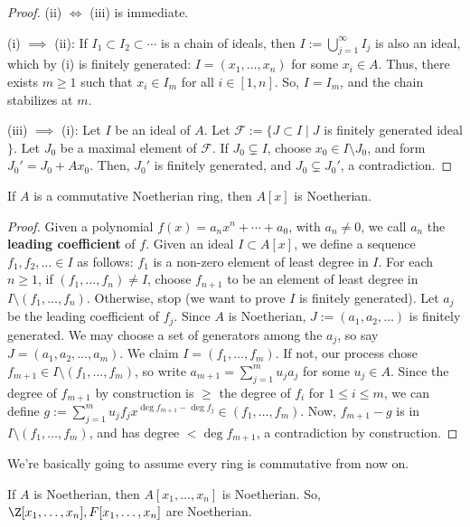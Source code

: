 \begin{proof}
    (ii) $\iff$ (iii) is immediate.

    (i) $\implies$ (ii): If $I _1\subset I_2 \subset \cdots$ is a chain of ideals, then $I := \bigcup _{j=1}^\infty I_j$ is also an ideal, which by (i) is finitely generated: $I= (x_1,\dots,x_n)$ for some $x_i \in A$. Thus, there exists $m \geq 1$ such that $x_i \in I_m$ for all $i \in [1,n]$. So, $I = I_m$, and the chain stabilizes at $m$.

    (iii) $\implies$ (i): Let $I$ be an ideal of $A$. Let $\mathcal F:= \{ J \subset I \mid J$ is finitely generated ideal$\}$. Let $J_0$ be a maximal element of $\mathcal F$. If $J_0 \subsetneq I$, choose $x_0 \in I \setminus J_0$, and form $J_0'=J_0 + Ax_0$. Then, $J_0'$ is finitely generated, and $J_0 \subsetneq J_0 '$, a contradiction.
\end{proof}

\begin{thm}
    If $A$ is a commutative Noetherian ring, then $A[x]$ is Noetherian.
\end{thm}

\begin{proof}
    Given a polynomial $f(x) = a_nx^n+\cdots +a_0$, with $a_n \neq 0$, we call $a_n$ the \textbf{leading coefficient} of $f$. Given an ideal $I \subset A[x]$, we define a sequence $f_1,f_2,\dots \in I$ as follows: $f_1$ is a non-zero element of least degree in $I$. For each $n \geq 1$, if $(f_1,\dots,f_n) \neq I$, choose $f_{n+1}$ to be an element of least degree in $I \setminus (f_1,\dots,f_n)$. Otherwise, stop (we want to prove $I$ is finitely generated). Let $a_j$ be the leading coefficient of $f_j$. Since $A$ is Noetherian, $J:= (a_1,a_2,\dots)$ is finitely generated. We may choose a set of generators among the $a_j$, so say $J = (a_1,a_2,\dots,a_m)$. We claim $I = (f_1,\dots,f_m)$. If not, our process chose $f_{m+1} \in I \setminus (f_1,\dots,f_m)$, so write $a_{m+1}=\sum_{j=1}^mu_ja_j$ for some $u_j \in A$. Since the degree of $f_{m+1}$ by construction is $\geq $ the degree of $f_i$ for $1 \leq i \leq m$, we can define $g:= \sum_{j=1}^m u_jf_jx^{\deg f_{m+1}- \deg f_j} \in (f_1,\dots,f_m)$. Now, $f_{m+1}-g$ is in $I \setminus (f_1,\dots,f_m)$, and has degree $< \deg f_{m+1}$, a contradiction by construction.
\end{proof}

We're basically going to assume every ring is commutative from now on.

\begin{cor}
    If $A$ is Noetherian, then $A[x_1,\dots,x_n]$ is Noetherian. So, $\Z[x_1,\dots,x_n],F[x_1,\dots,x_n]$ are Noetherian.
\end{cor}

